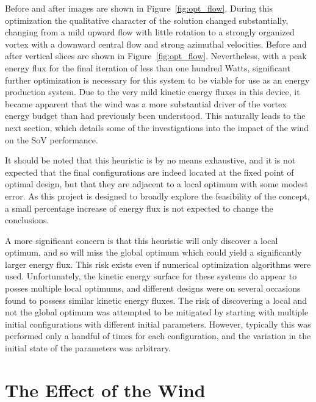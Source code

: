 

Before and after images are shown in
Figure~\ref{fig:opt_flow}. During this optimization 
the qualitative character of the solution changed substantially,
changing from a mild upward flow with little rotation to a strongly
organized vortex with a downward central flow and strong azimuthal 
velocities. Before and after vertical slices are shown in
Figure~\ref{fig:opt_flow}. Nevertheless, with a peak energy flux for the
final iteration of less than one hundred Watts, significant further 
optimization is necessary for this system to be viable for use as an 
energy production system. Due to the very mild kinetic energy fluxes in
this device, it became apparent that the wind was a more substantial
driver of the vortex energy budget than had previously been understood. 
This naturally leads to the next section, which details some of the
investigations into the impact of the wind on the SoV performance. 

It should be noted that this heuristic is by no means exhaustive, and it
is not expected that the final configurations are indeed located at the
fixed point of optimal design, but that they are adjacent to a local
optimum with some modest error. As this project is designed to broadly
explore the feasibility of the concept, a small percentage increase of
energy flux is not expected to change the conclusions. 

A more significant concern is that this heuristic will only discover a
local optimum, and so will miss the global optimum which could yield a
significantly larger energy flux. This risk exists even if
numerical optimization algorithms were used. Unfortunately, the kinetic
energy surface for these systems do appear to posses multiple local
optimums, and different designs were on several occasions found to possess
similar kinetic energy fluxes. The risk of discovering a local 
and not the global optimum was attempted to be mitigated by starting
with multiple initial configurations with different initial
parameters. However, typically this was performed only a handful of
times for each configuration, and the variation in the initial state of
the parameters was arbitrary. 

\section{The Effect of the Wind}
\label{sec:wind_impact}

